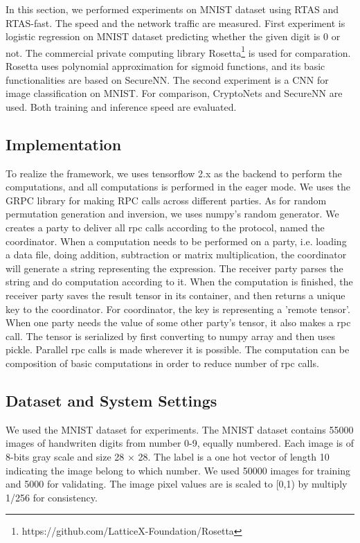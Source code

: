 In this section, we performed experiments on MNIST dataset using RTAS and RTAS-fast. The speed and the network traffic are measured. First experiment is logistic regression on MNIST\cite{lecun1998mnist} dataset predicting whether the given digit is 0 or not. The commercial private computing library Rosetta\footnote{https://github.com/LatticeX-Foundation/Rosetta} is used for comparation. Rosetta uses polynomial approximation for sigmoid functions, and its basic functionalities are based on SecureNN. The second experiment is a CNN for image classification on MNIST. For comparison, CryptoNets and SecureNN are used. Both training and inference speed are evaluated.
\subsection{Implementation}
To realize the framework, we uses tensorflow 2.x as the backend to perform the computations, and all computations is performed in the eager mode. We uses the GRPC library for making RPC calls across different parties. 
As for random permutation generation and inversion, we uses numpy's random generator. We creates a party to deliver all rpc calls according to the protocol, named the coordinator. When a computation needs to be performed on a party, i.e. loading a data file, doing addition, subtraction or matrix multiplication, the coordinator will generate a string representing the expression. The receiver party parses the string and do computation according to it. When the computation is finished, the receiver party saves the result tensor in its container, and then returns a unique key to the coordinator. For coordinator, the key is representing a 'remote tensor'. When one party needs the value of some other party's tensor, it also makes a rpc call. The tensor is serialized by first converting to numpy array and then uses pickle. Parallel rpc calls is made wherever it is possible. The computation can be composition of basic computations in order to reduce number of rpc calls.
\subsection{Dataset and System Settings}
We used the MNIST dataset for experiments. The MNIST dataset contains 55000 images of handwriten digits from number 0-9, equally numbered. Each image is of 8-bits gray scale and size 28 × 28. The label is a one hot vector of length 10 indicating the image belong to which number. We used 50000 images for training and 5000 for validating. The image pixel values are is scaled to [0,1) by multiply 1/256 for consistency. 

